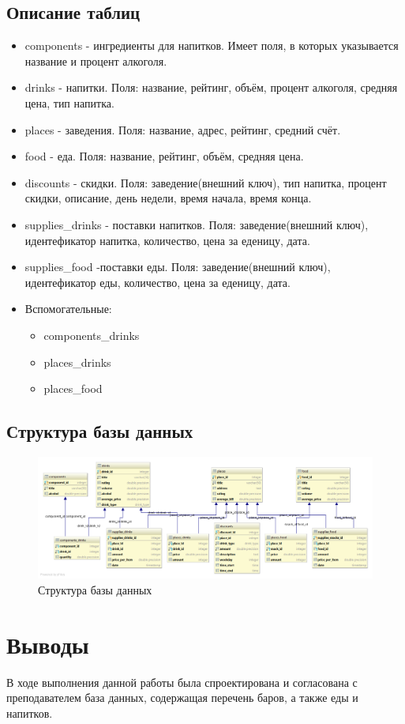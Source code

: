 \subsection{Описание таблиц}
\begin{itemize}
	\item components - ингредиенты для напитков. Имеет поля, в которых указывается название и процент алкоголя.
	\item drinks - напитки. Поля: название, рейтинг, объём, процент алкоголя, средняя цена, тип напитка.
	\item places - заведения. Поля: название, адрес, рейтинг, средний счёт.
	\item food - еда. Поля: название, рейтинг, объём, средняя цена.
	\item discounts - скидки. Поля: заведение(внешний ключ), тип напитка, процент скидки, описание, день недели, время начала, время конца.
	\item supplies\_drinks - поставки напитков. Поля: заведение(внешний ключ), идентефикатор напитка, количество, цена за еденицу, дата.
	\item supplies\_food -поставки еды. Поля: заведение(внешний ключ), идентефикатор еды, количество, цена за еденицу, дата.
	\item Вспомогательные: 
		\begin {itemize}
		\item components\_drinks
		\item places\_drinks
		\item places\_food
	\end {itemize}
\end{itemize}


\subsection{Структура базы данных}

\begin{figure}[H]
	\begin{center}
		\includegraphics[scale=0.3]{../../structure.png}
		\caption{Структура базы данных} 
		\label{pic:struct} %
	\end{center}
\end{figure}

\section{Выводы}

В ходе выполнения данной работы была спроектирована и согласована с преподавателем база данных, содержащая перечень баров, а также еды и напитков.



